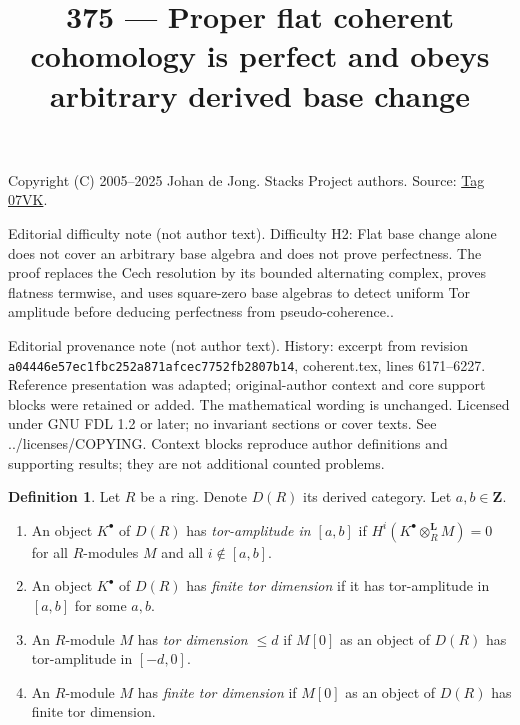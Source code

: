 \documentclass{amsart}
\theoremstyle{plain}
\theoremstyle{definition}
\newtheorem{definition}[subsection]{Definition}
\theoremstyle{remark}
\numberwithin{equation}{subsection}
\begin{document}
\title[Stacks Project, Tag 07VK]{375 --- Proper flat coherent cohomology is perfect and obeys arbitrary derived base change}
\maketitle
\noindent Copyright (C) 2005--2025 Johan de Jong. Stacks Project authors. Source: \href{https://stacks.math.columbia.edu/tag/07VK}{Tag 07VK}.

\noindent Editorial difficulty note (not author text). Difficulty H2: Flat base change alone does not cover an arbitrary base algebra and does not prove perfectness. The proof replaces the Cech resolution by its bounded alternating complex, proves flatness termwise, and uses square-zero base algebras to detect uniform Tor amplitude before deducing perfectness from pseudo-coherence..

\noindent Editorial provenance note (not author text). History: excerpt from revision \texttt{a0444\allowbreak 6e57e\allowbreak c1fbc\allowbreak 252a8\allowbreak 71afc\allowbreak ec775\allowbreak 2fb28\allowbreak 07b14}, coherent.tex, lines 6171--6227. Reference presentation was adapted; original-author context and core support blocks were retained or added. The mathematical wording is unchanged. Licensed under GNU FDL 1.2 or later; no invariant sections or cover texts. See ../licenses/COPYING. Context blocks reproduce author definitions and supporting results; they are not additional counted problems.

\begin{definition}
\label{more-algebra-definition-tor-amplitude}
Let $R$ be a ring. Denote $D(R)$ its derived category.
Let $a, b \in \mathbf{Z}$.
\begin{enumerate}
\item An object $K^\bullet$ of $D(R)$ has
{\it tor-amplitude in $[a, b]$}
if $H^i(K^\bullet \otimes_R^\mathbf{L} M) = 0$ for all $R$-modules
$M$ and all $i \not \in [a, b]$.
\item An object $K^\bullet$ of $D(R)$ has {\it finite tor dimension}
if it has tor-amplitude in $[a, b]$ for some $a, b$.
\item An $R$-module $M$ has {\it tor dimension $\leq d$}
if $M[0]$ as an object of $D(R)$ has tor-amplitude in $[-d, 0]$.
\item An $R$-module $M$ has {\it finite tor dimension}
if $M[0]$ as an object of $D(R)$ has finite tor dimension.
\end{enumerate}
\end{definition}
\end{document}
